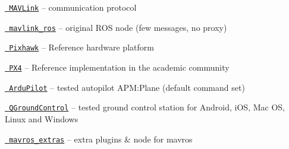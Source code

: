 \begin{DoxyItemize}
\item \href{http://mavlink.org/mavlink/start}{\texttt{ M\+A\+V\+Link}} -- communication protocol
\item \href{https://github.com/mavlink/mavlink_ros}{\texttt{ mavlink\+\_\+ros}} -- original R\+OS node (few messages, no proxy)
\item \href{http://pixhawk.org/}{\texttt{ Pixhawk}} -- Reference hardware platform
\item \href{http://px4.io/}{\texttt{ P\+X4}} -- Reference implementation in the academic community
\item \href{http://ardupilot.com/}{\texttt{ Ardu\+Pilot}} -- tested autopilot A\+PM\+:Plane (default command set)
\item \href{http://qgroundcontrol.org/}{\texttt{ Q\+Ground\+Control}} -- tested ground control station for Android, i\+OS, Mac OS, Linux and Windows
\item \href{https://github.com/mavlink/mavros/tree/master/mavros_extras}{\texttt{ mavros\+\_\+extras}} -- extra plugins \& node for mavros 
\end{DoxyItemize}